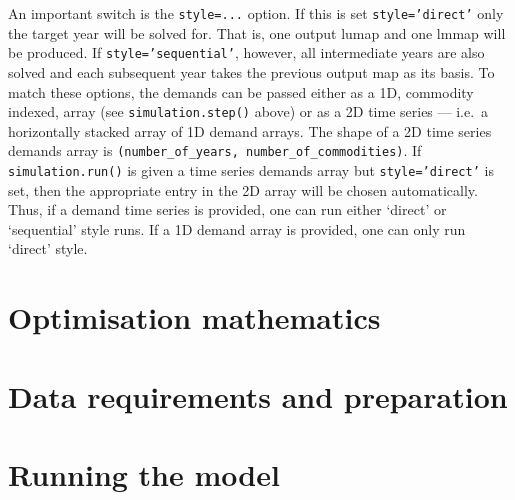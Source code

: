 \documentclass{draft}
\begin{document}
An important switch is the \texttt{style=...} option. If this is set \texttt{style='direct'} only the target year will be solved for. That is, one output lumap and one lmmap will be produced. If \texttt{style='sequential'}, however, all intermediate years are also solved and each subsequent year takes the previous output map as its basis. To match these options, the demands can be passed either as a 1D, commodity indexed, array (see \texttt{simulation.step()} above) or as a 2D time series --- i.e.\ a horizontally stacked array of 1D demand arrays. The shape of a 2D time series demands array is \texttt{(number_of_years, number_of_commodities)}. If \texttt{simulation.run()} is given a time series demands array but \texttt{style='direct'} is set, then the appropriate entry in the 2D array will be chosen automatically. Thus, if a demand time series is provided, one can run either `direct' or `sequential' style runs. If a 1D demand array is provided, one can only run `direct' style.





\section{Optimisation mathematics}\label{sec:mathematics}

\section{Data requirements and preparation}\label{sec:dataprep}

\section{Running the model}\label{sec:running}
\end{document}

